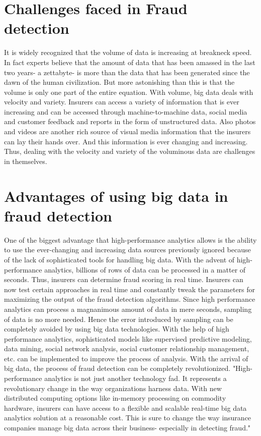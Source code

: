 \documentclass[sigconf]{acmart}
\begin{document}
\section{Challenges faced in Fraud detection}
It is widely recognized that the volume of data is increasing at breakneck speed. In fact experts believe that the amount of data that has been amassed in the last two years- a zettabyte- is more than the data that has been generated since the dawn of the human civilization.\cite{link2} But more astonishing than this is that the volume is only one part of the entire equation. With volume, big data deals with velocity and variety. Insurers can access a variety of information that is ever increasing and can be accessed through machine-to-machine data, social media and customer feedback and reports in the form of unstructured data. Also photos and videos are another rich source of visual media information that the insurers can lay their hands over. And this information is ever changing and increasing. Thus, dealing with the velocity and variety of the voluminous data are challenges in themselves. \cite{link3}

\section{Advantages of using big data in fraud detection}
One of the biggest advantage that high-performance analytics allows is the ability to use the ever-changing and increasing data sources previously ignored because of the lack of sophisticated tools for handling big data. With the advent of high-performance analytics, billions of rows of data can be processed in a matter of seconds. Thus, insurers can determine fraud scoring in real time. Insurers can now test certain approaches in real time and constantly tweak the parameters for maximizing the output of the fraud detection algorithms. Since high performance analytics can process a magnanimous amount of data in mere seconds, sampling of data is no more needed. Hence the error introduced by sampling can be completely avoided by using big data technologies. With the help of high performance analytics, sophisticated models like supervised predictive modeling, data mining, social network analysis, social customer relationship management, etc. can be implemented to improve the process of analysis. With the arrival of big data, the process of fraud detection can be completely revolutionized. 
"High-performance analytics is not just another technology fad. It represents a revolutionary change in the way organizations harness data. With new distributed computing options like in-memory processing on commodity hardware, insurers can have access to a flexible and scalable real-time big data analytics solution at a reasonable cost. This is sure to change the way insurance companies manage big data across their business- especially in detecting fraud."\cite{link3}
\end{document}
